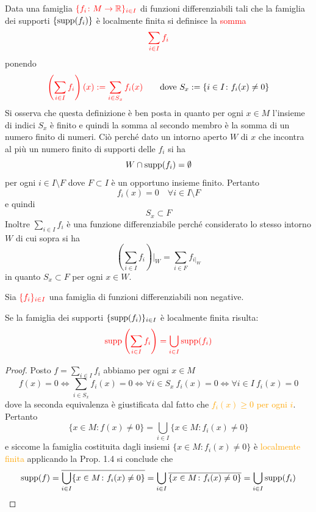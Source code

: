         Data una famiglia $\textcolor{red}{\{f_i \colon M \to \mathbb{R}\}_{i \in I}}$ di funzioni differenziabili tali che la famiglia dei supporti $\{\operatorname{supp}(f_i)\}$ è localmente finita si definisce la \textcolor{red}{somma}
        \[
        \textcolor{red}{\sum_{i \in I} f_i}
        \]
        ponendo
        \[
        \textcolor{red}{\left(\sum_{i \in I} f_i\right)(x) := \sum_{i \in S_x} f_i(x)} \qquad \text{dove } S_x := \{i \in I \colon f_i(x) \neq 0\}
        \]
        Si osserva che questa definizione è ben posta in quanto per ogni $x \in M$ l'insieme di indici $S_x$ è finito e quindi la somma al secondo membro è la somma di un numero finito di numeri. Ciò perché dato un intorno aperto $W$ di $x$ che incontra al più un numero finito di supporti delle $f_i$ si ha
        \[
        W \cap \operatorname{supp}(f_i) = \emptyset
        \]
        per ogni $i \in I \setminus F$ dove $F \subset I$ è un opportuno insieme finito. Pertanto
        \[
        f_i(x) = 0 \quad \forall i \in I \setminus F
        \]
        e quindi
        \[
        S_x \subset F
        \]
        Inoltre $\sum_{i \in I} f_i$ è una funzione differenziabile perché considerato lo stesso intorno $W$ di cui sopra si ha
        \[
        \left(\sum_{i \in I} f_i\right)\Big|_W = \sum_{i \in F} f_{i|_W}
        \]
        in quanto $S_x \subset F$ per ogni $x \in W$.
        \newpage
        \begin{proposizione}
        \label{prop:supporto_somma_localmente_finita}
        \mbox{}

        Sia $\textcolor{red}{\{f_i\}_{i \in I}}$ una famiglia di funzioni differenziabili non negative. 
        
        Se la famiglia dei supporti $\{\operatorname{supp}(f_i)\}_{i \in I}$ è localmente finita risulta:
        \[
        \textcolor{red}{\operatorname{supp}\left(\sum_{i \in I} f_i\right) = \bigcup_{i \in I} \operatorname{supp}(f_i)}
        \]
        \end{proposizione}

        \begin{proof}
        Posto $f = \sum_{i \in I} f_i$ abbiamo per ogni $x \in M$
        \[
        f(x) = 0 \iff \sum_{i \in S_x} f_i(x) = 0 \iff \forall i \in S_x \ f_i(x) = 0 \iff \forall i \in I \ f_i(x) = 0
        \]
        dove la seconda equivalenza è giustificata dal fatto che \textcolor{orange}{$f_i(x) \geq 0$ per ogni $i$}. Pertanto
        \[
        \{x \in M \colon f(x) \neq 0\} = \bigcup_{i \in I} \{x \in M \colon f_i(x) \neq 0\}
        \]
        e siccome la famiglia costituita dagli insiemi $\{x \in M \colon f_i(x) \neq 0\}$ è \textcolor{orange}{localmente finita} applicando la Prop. 1.4 si conclude che
        \[
        \operatorname{supp}(f) = \overline{\bigcup_{i \in I} \{x \in M \colon f_i(x) \neq 0\}} = \bigcup_{i \in I} \overline{\{x \in M \colon f_i(x) \neq 0\}} = \bigcup_{i \in I} \operatorname{supp}(f_i)
        \]
        \end{proof}

